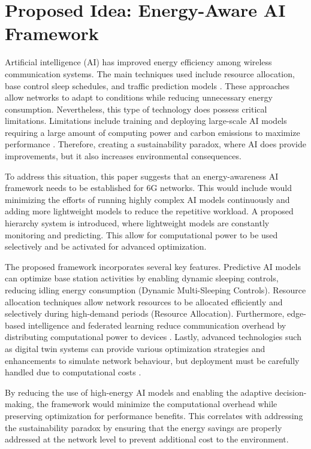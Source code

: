 \documentclass[letterpaper]{article} %
\begin{document}
\section{Proposed Idea: Energy-Aware AI Framework}
Artificial intelligence (AI) has improved energy efficiency among wireless communication systems. The main techniques used include resource allocation, base control sleep schedules, and traffic prediction models \cite{masoudi_data_nodate, pan_dynamic_2024, fotock_energy_2024}. These approaches allow networks to adapt to conditions while reducing unnecessary energy consumption. Nevertheless, this type of technology does possess critical limitations. Limitations include training and deploying large-scale AI models requiring a large amount of computing power and carbon emissions to maximize performance \cite{luccioni_power_2024, strubell_energy_2019}. Therefore, creating a sustainability paradox, where AI does provide improvements, but it also increases environmental consequences.

To address this situation, this paper suggests that an energy-awareness AI framework needs to be established for 6G networks. This would include would minimizing the efforts of running highly complex AI models continuously and adding more lightweight models to reduce the repetitive workload. A proposed hierarchy system is introduced, where lightweight models are constantly monitoring and predicting. This allow for computational power to be used selectively and be activated for advanced optimization.

The proposed framework incorporates several key features. Predictive AI models can optimize base station activities by enabling dynamic sleeping controls, reducing idling energy consumption (Dynamic Multi-Sleeping Controls). Resource allocation techniques allow network resources to be allocated efficiently and selectively during high-demand periods (Resource Allocation). Furthermore, edge-based intelligence and federated learning reduce communication overhead by distributing computational power to devices \cite{fernando_energy-efficient_2024}. Lastly, advanced technologies such as digital twin systems can provide various optimization strategies and enhancements to simulate network behaviour, but deployment must be carefully handled due to computational costs \cite{liu_6g_2025}.

By reducing the use of high-energy AI models and enabling the adaptive decision-making, the framework would minimize the computational overhead while preserving optimization for performance benefits. This correlates with addressing the sustainability paradox by ensuring that the energy savings are properly addressed at the network level to prevent additional cost to the environment.
\end{document}
